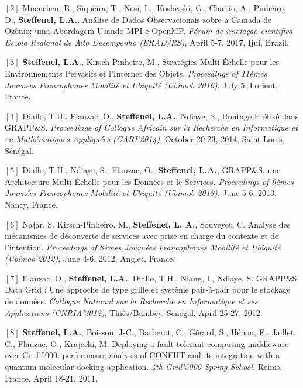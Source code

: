 \documentclass[final,twoside]{hdr} %
\begin{document}
\vspace{1em} \noindent $[2]$
Muenchen, B., Siqueira, T., Nesi, L., Koslovski, G., Charão, A., Pinheiro, D., \textbf{Steffenel, L.A.}, {Análise de Dados Observacionais sobre a Camada de Ozônio: uma Abordagem Usando MPI e OpenMP}. {\em Fórum de iniciação científica Escola Regional de Alto Desempenho (ERAD/RS)}, April 5-7, 2017, Ijui, Brazil.

\vspace{1em} \noindent $[3]$
\textbf{Steffenel, L.A.}, Kirsch-Pinheiro, M., {Stratégies Multi-Échelle pour les Environnements Pervasifs et l’Internet des Objets}. {\em Proceedings of 11èmes Journées Francophones Mobilité et Ubiquité (Ubimob 2016)}, July 5, Lorient, France.

\vspace{1em} \noindent $[4]$
Diallo, T.H., Flauzac, O., \textbf{Steffenel, L.A.}, Ndiaye, S., {Routage Préfixé dans GRAPP\&S}. {\em Proceedings of Colloque Africain sur la Recherche en Informatique et en Mathématiques Appliquées (CARI'2014)}, October 20-23, 2014, Saint Louis, Sénégal.

\vspace{1em} \noindent $[5]$
Diallo, T.H., Ndiaye, S., Flauzac, O., \textbf{Steffenel, L.A.}, {GRAPP\&S, une Architecture Multi-Échelle pour les Données et le Services}. {\em Proceedings of 9èmes Journées Francophones Mobilité et Ubiquité (Ubimob 2013)}, June 5-6, 2013, Nancy, France. 

\vspace{1em} \noindent $[6]$
Najar, S. Kirsch-Pinheiro, M., \textbf{Steffenel, L. A.}, Souveyet, C. {Analyse des mécanismes de découverte de services avec prise en charge du contexte et de l'intention}. {\em Proceedings of 8èmes Journées Francophones Mobilité et Ubiquité (Ubimob 2012)}, June 4-6, 2012, Anglet, France. 

\vspace{1em} \noindent $[7]$
Flauzac, O., \textbf{Steffenel, L.A.}, Diallo, T.H., Niang, I., Ndiaye, S. {GRAPP\&S Data Grid : Une approche de type grille et système pair-à-pair pour le stockage de données}. {\em Colloque National sur la Recherche en Informatique et ses Applications (CNRIA'2012)}, Thiès/Bambey, Senegal. April 25-27, 2012.

\vspace{1em} \noindent $[8]$
\textbf{Steffenel, L.A.}, Boisson, J-C., Barberot, C., Gérard, S., Hénon, E., Jaillet, C., Flauzac, O., Krajecki, M. {Deploying a fault-tolerant computing middleware over Grid’5000: performance analysis of CONFIIT and its integration with a quantum molecular docking application}. {\em 4th Grid'5000 Spring School}, Reims, France, April 18-21, 2011. 
\end{document}
